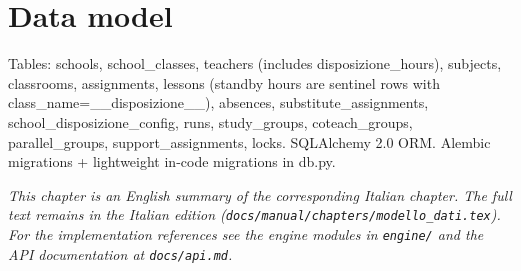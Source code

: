 \chapter{Data model}
\label{ch:modello_dati_en}

Tables: schools, school_classes, teachers (includes disposizione\_hours), subjects, classrooms, assignments, lessons (standby hours are sentinel rows with class\_name=\_\_disposizione\_\_), absences, substitute\_assignments, school\_disposizione\_config, runs, study\_groups, coteach\_groups, parallel\_groups, support\_assignments, locks. SQLAlchemy 2.0 ORM. Alembic migrations + lightweight in-code migrations in db.py.

\medskip
\noindent
\textit{This chapter is an English summary of the corresponding Italian chapter. The full text remains in the Italian edition (\texttt{docs/manual/chapters/modello\_dati.tex}). For the implementation references see the engine modules in \texttt{engine/} and the API documentation at \texttt{docs/api.md}.}
